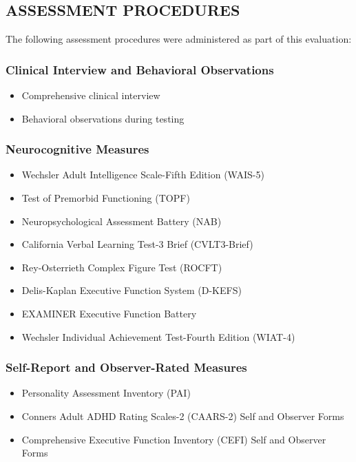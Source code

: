 \documentclass[
  letterpaper,
  DIV=11,
  numbers=noendperiod]{scrartcl}
\providecommand{\tightlist}{%
  \setlength{\itemsep}{0pt}\setlength{\parskip}{0pt}}
\begin{document}
\subsection{ASSESSMENT PROCEDURES}\label{assessment-procedures}

The following assessment procedures were administered as part of this
evaluation:

\subsubsection{Clinical Interview and Behavioral
Observations}\label{clinical-interview-and-behavioral-observations}

\begin{itemize}
\tightlist
\item
  Comprehensive clinical interview
\item
  Behavioral observations during testing
\end{itemize}

\subsubsection{Neurocognitive Measures}\label{neurocognitive-measures}

\begin{itemize}
\tightlist
\item
  Wechsler Adult Intelligence Scale-Fifth Edition (WAIS-5)
\item
  Test of Premorbid Functioning (TOPF)
\item
  Neuropsychological Assessment Battery (NAB)
\item
  California Verbal Learning Test-3 Brief (CVLT3-Brief)
\item
  Rey-Osterrieth Complex Figure Test (ROCFT)
\item
  Delis-Kaplan Executive Function System (D-KEFS)
\item
  EXAMINER Executive Function Battery
\item
  Wechsler Individual Achievement Test-Fourth Edition (WIAT-4)
\end{itemize}

\subsubsection{Self-Report and Observer-Rated
Measures}\label{self-report-and-observer-rated-measures}

\begin{itemize}
\tightlist
\item
  Personality Assessment Inventory (PAI)
\item
  Conners Adult ADHD Rating Scales-2 (CAARS-2) Self and Observer Forms
\item
  Comprehensive Executive Function Inventory (CEFI) Self and Observer
  Forms
\end{itemize}
\end{document}
